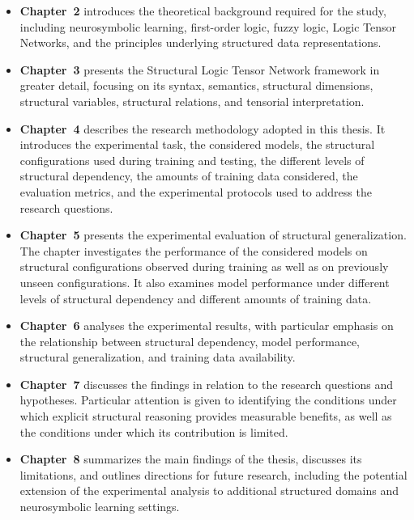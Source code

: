 \begin{itemize}

\item \textbf{Chapter~2} introduces the theoretical background required for the study, including neurosymbolic learning, first-order logic, fuzzy logic, Logic Tensor Networks, and the principles underlying structured data representations.

\item \textbf{Chapter~3} presents the Structural Logic Tensor Network framework in greater detail, focusing on its syntax, semantics, structural dimensions, structural variables, structural relations, and tensorial interpretation.
\item \textbf{Chapter~4} describes the research methodology adopted in this thesis. It introduces the experimental task, the considered models, the structural configurations used during training and testing, the different levels of structural dependency, the amounts of training data considered, the evaluation metrics, and the experimental protocols used to address the research questions.

\item \textbf{Chapter~5} presents the experimental evaluation of structural generalization. The chapter investigates the performance of the considered models on structural configurations observed during training as well as on previously unseen configurations. It also examines model performance under different levels of structural dependency and different amounts of training data.

\item \textbf{Chapter~6} analyses the experimental results, with particular emphasis on the relationship between structural dependency, model performance, structural generalization, and training data availability.

\item \textbf{Chapter~7} discusses the findings in relation to the research questions and hypotheses. Particular attention is given to identifying the conditions under which explicit structural reasoning provides measurable benefits, as well as the conditions under which its contribution is limited.

\item \textbf{Chapter~8} summarizes the main findings of the thesis, discusses its limitations, and outlines directions for future research, including the potential extension of the experimental analysis to additional structured domains and neurosymbolic learning settings.

\end{itemize}
